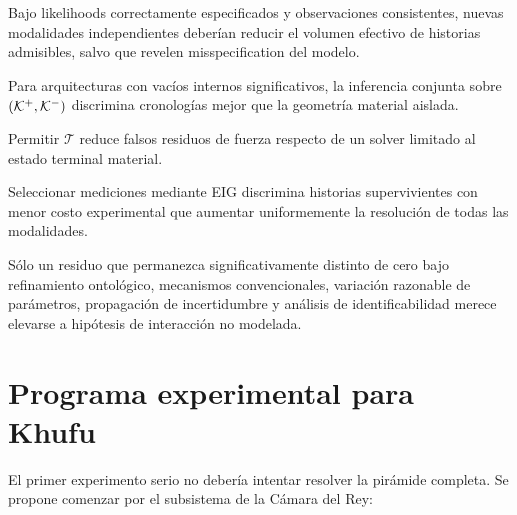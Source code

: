 \begin{conjecture}
Bajo likelihoods correctamente especificados y observaciones consistentes, nuevas modalidades independientes deberían reducir el volumen efectivo de historias admisibles, salvo que revelen misspecification del modelo.
\end{conjecture}

\begin{conjecture}
Para arquitecturas con vacíos internos significativos, la inferencia conjunta sobre \((\mathcal K^{+},\mathcal K^{-})\) discrimina cronologías mejor que la geometría material aislada.
\end{conjecture}

\begin{conjecture}
Permitir \(\mathcal T\) reduce falsos residuos de fuerza respecto de un solver limitado al estado terminal material.
\end{conjecture}

\begin{conjecture}
Seleccionar mediciones mediante EIG discrimina historias supervivientes con menor costo experimental que aumentar uniformemente la resolución de todas las modalidades.
\end{conjecture}

\begin{conjecture}
Sólo un residuo que permanezca significativamente distinto de cero bajo refinamiento ontológico, mecanismos convencionales, variación razonable de parámetros, propagación de incertidumbre y análisis de identificabilidad merece elevarse a hipótesis de interacción no modelada.
\end{conjecture}

\section{Programa experimental para Khufu}

El primer experimento serio no debería intentar resolver la pirámide completa. Se propone comenzar por el subsistema de la Cámara del Rey:

